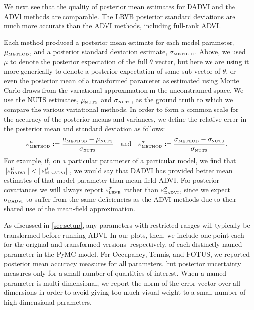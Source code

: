 \PosteriorAccuracyARM{}
\PosteriorAccuracyNonARM{}

We next see that the quality of posterior mean estimates for DADVI and the ADVI
methods are comparable. The LRVB posterior standard deviations are much more
accurate than the ADVI methods, including full-rank ADVI. 

Each method produced a posterior mean estimate for each model parameter,
$\mu_{\textrm{\tiny METHOD}}$, and a posterior standard deviation estimate, $\sigma_{\textrm{\tiny METHOD}}$.
Above, we used $\mu$ to denote the posterior expectation of the full $\theta$
vector, but here we are using it more generically to denote a posterior
expectation of some sub-vector of $\theta$, or even the posterior mean of a
transformed parameter as estimated using Monte Carlo draws from the variational
approximation in the unconstrained space. We use the NUTS estimates, $\mu_{\textrm{\tiny NUTS}}$
and $\sigma_{\textrm{\tiny NUTS}}$, as the ground truth to which we compare the various
variational methods.  In order to form a common scale for the accuracy of the
posterior means and variances, we define the relative error in the posterior
mean and standard deviation as follows:
%
\begin{align*}
%
\muerr_\method :={} \frac{\mu_\method - \mu_\nuts}{\sigma_\nuts}
\quad\textrm{and}\quad
\sderr_\method :={} \frac{\sigma_\method - \sigma_\nuts}{\sigma_\nuts}.
%
\end{align*}
%
For example, if, on a particular parameter of a particular model, we find that
$\left\Vert \varepsilon^{\mu}_{\textrm{\tiny DADVI}}\right\Vert < \left\Vert \varepsilon^{\mu}_{\textrm{\tiny MF-ADVI}}\right\Vert$, we would say that DADVI has
provided better mean estimates of that model parameter than mean-field ADVI. For
posterior covariances we will always report $\varepsilon^{\sigma}_{\textrm{\tiny LRVB}}$ rather than
$\varepsilon^{\sigma}_{\textrm{\tiny DADVI}}$, since we expect $\sigma_{\textrm{\tiny DADVI}}$ to suffer from the same
deficiencies as the ADVI methods due to their shared use of the
mean-field approximation.

As discussed in \cref{sec:setup}, any parameters with restricted ranges will
typically be transformed before running ADVI. In our plots, then, we include one
point each for the original and transformed versions, respectively, of each
distinctly named parameter in the PyMC model. For Occupancy, Tennis, and POTUS,
we reported posterior mean accuracy measures for all parameters, but posterior
uncertainty measures only for a small number of quantities of interest. When a
named parameter is multi-dimensional, we report the norm of the error vector
over  all dimensions in order to avoid giving too much visual weight to a small
number of high-dimensional parameters.

